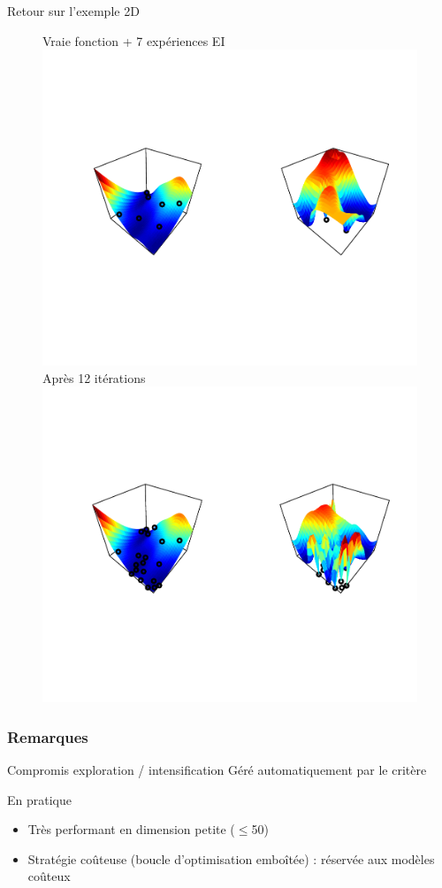 \begin{frame}[noframenumbering]{Retour sur l'exemple 2D}
\begin{figure}
\hspace{5mm} Vraie fonction + 7 expériences \hspace{20mm} EI
	\includegraphics[trim=12mm 45mm 12mm 40mm,width=.8\textwidth, clip]{fig/exEI2D1.pdf}\\
Après 12 itérations	\includegraphics[trim=12mm 48mm 90mm 40mm,width=.4\textwidth, clip]{fig/exEI2D2.pdf}
\end{figure}
\end{frame}
\begin{frame}
\frametitle{Remarques}
\begin{block}{Compromis exploration / intensification}
Géré automatiquement par le critère
\end{block}

\begin{block}{En pratique}
\begin{itemize}
 \item Très performant en dimension petite ($\leq$50)
 \item Stratégie coûteuse (boucle d'optimisation emboîtée) : réservée aux modèles coûteux
\end{itemize}
\end{block}


\end{frame}

